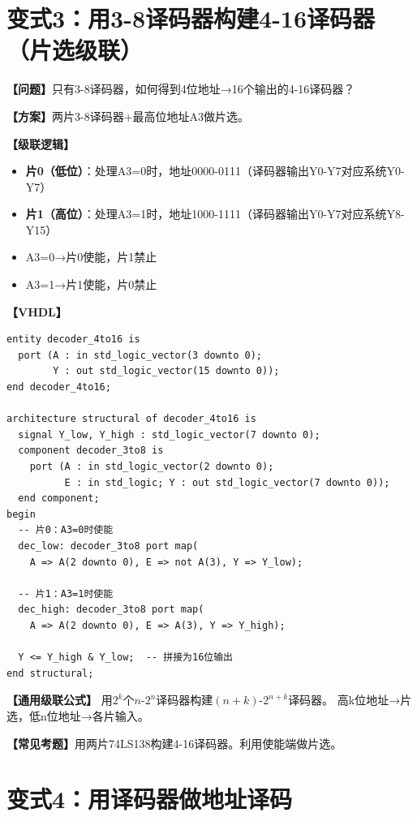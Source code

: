 \section{变式3：用3-8译码器构建4-16译码器（片选级联）}

\begin{detailbox}[完整教学]

\textbf{【问题】}只有3-8译码器，如何得到4位地址→16个输出的4-16译码器？

\textbf{【方案】}两片3-8译码器+最高位地址A3做片选。

\textbf{【级联逻辑】}
\begin{itemize}
  \item \textbf{片0（低位）}：处理A3=0时，地址0000-0111（译码器输出Y0-Y7对应系统Y0-Y7）
  \item \textbf{片1（高位）}：处理A3=1时，地址1000-1111（译码器输出Y0-Y7对应系统Y8-Y15）
  \item A3=0→片0使能，片1禁止
  \item A3=1→片1使能，片0禁止
\end{itemize}

\textbf{【VHDL】}
\begin{lstlisting}
entity decoder_4to16 is
  port (A : in std_logic_vector(3 downto 0);
        Y : out std_logic_vector(15 downto 0));
end decoder_4to16;

architecture structural of decoder_4to16 is
  signal Y_low, Y_high : std_logic_vector(7 downto 0);
  component decoder_3to8 is
    port (A : in std_logic_vector(2 downto 0);
          E : in std_logic; Y : out std_logic_vector(7 downto 0));
  end component;
begin
  -- 片0：A3=0时使能
  dec_low: decoder_3to8 port map(
    A => A(2 downto 0), E => not A(3), Y => Y_low);

  -- 片1：A3=1时使能
  dec_high: decoder_3to8 port map(
    A => A(2 downto 0), E => A(3), Y => Y_high);

  Y <= Y_high & Y_low;  -- 拼接为16位输出
end structural;
\end{lstlisting}

\textbf{【通用级联公式】}
用$2^k$个$n$-$2^n$译码器构建$(n+k)$-$2^{n+k}$译码器。
高k位地址→片选，低n位地址→各片输入。

\textbf{【常见考题】}用两片74LS138构建4-16译码器。利用使能端做片选。

\end{detailbox}


\section{变式4：用译码器做地址译码}

